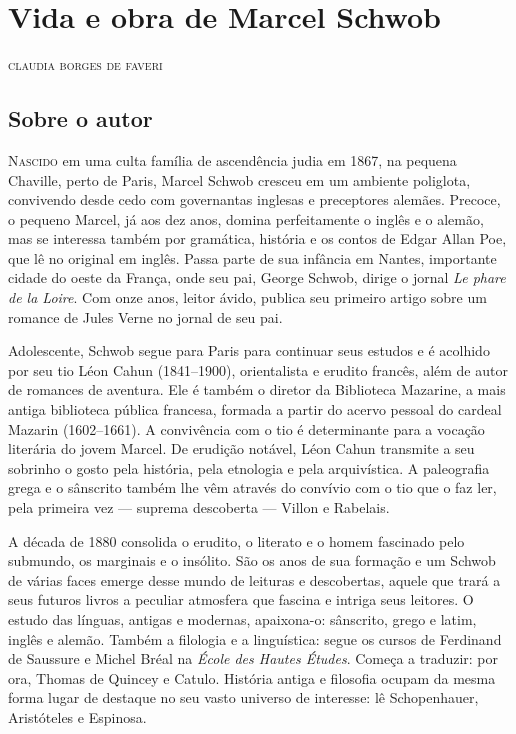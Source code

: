\chapter{Vida e obra de Marcel Schwob}

\begin{flushright}
\textsc{claudia borges de faveri}
\end{flushright}\bigskip

\section{Sobre o autor}

\noindent\textsc{Nascido} em uma culta família de ascendência judia em 1867, na pequena
Chaville, perto de Paris, Marcel Schwob cresceu em um ambiente poliglota,
convivendo desde cedo com governantas inglesas e preceptores alemães. Precoce,
o pequeno Marcel, já aos dez anos, domina perfeitamente o inglês e o alemão,
mas se interessa também por gramática, história e os contos de Edgar Allan Poe,
que lê no original em inglês. Passa parte de sua infância em Nantes,
importante cidade do oeste da França, onde seu pai, George Schwob, dirige o
jornal \textit{Le phare de la Loire}. Com onze anos, leitor ávido, publica seu
primeiro artigo sobre um romance de Jules Verne no jornal de seu pai.

Adolescente, Schwob segue para Paris para continuar seus estudos e é
acolhido por seu tio Léon Cahun (1841--1900), orientalista e erudito francês,
além de autor de romances de aventura. Ele é também o diretor da Biblioteca
Mazarine, a mais antiga biblioteca pública francesa, formada a partir do acervo
pessoal do cardeal Mazarin (1602--1661). A convivência com o tio é determinante
para a vocação literária do jovem Marcel. De erudição notável, Léon Cahun
transmite a seu sobrinho o gosto pela história, pela etnologia e pela
arquivística. A paleografia grega e o sânscrito também lhe vêm através do
convívio com o tio que o faz ler, pela primeira vez --- suprema descoberta --- Villon e Rabelais.

A década de 1880 consolida o erudito, o literato e o homem fascinado pelo
submundo, os marginais e o insólito. São os anos de sua formação e um Schwob de
várias faces emerge desse mundo de leituras e descobertas, aquele que trará a
seus futuros livros a peculiar atmosfera que fascina e intriga seus leitores. O
estudo das línguas, antigas e modernas, apaixona-o: sânscrito, grego e latim,
inglês e alemão. Também a filologia e a linguística: segue os cursos de
Ferdinand de Saussure e Michel Bréal na \textit{École des Hautes Études}.
Começa a traduzir: por ora, Thomas de Quincey e Catulo. História antiga e
filosofia ocupam da mesma forma lugar de destaque no seu vasto universo de
interesse: lê Schopenhauer, Aristóteles e Espinosa.

